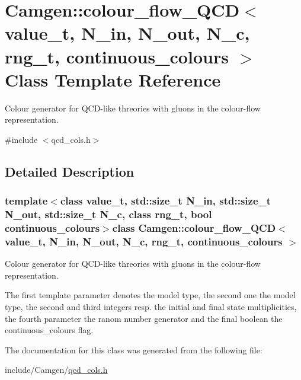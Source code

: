 \hypertarget{a00079}{\section{Camgen\-:\-:colour\-\_\-flow\-\_\-\-Q\-C\-D$<$ value\-\_\-t, N\-\_\-in, N\-\_\-out, N\-\_\-c, rng\-\_\-t, continuous\-\_\-colours $>$ Class Template Reference}
\label{a00079}
}


Colour generator for Q\-C\-D-\/like threories with gluons in the colour-\/flow representation.  




{\ttfamily \#include $<$qcd\-\_\-cols.\-h$>$}



\subsection{Detailed Description}
\subsubsection*{template$<$class value\-\_\-t, std\-::size\-\_\-t N\-\_\-in, std\-::size\-\_\-t N\-\_\-out, std\-::size\-\_\-t N\-\_\-c, class rng\-\_\-t, bool continuous\-\_\-colours$>$class Camgen\-::colour\-\_\-flow\-\_\-\-Q\-C\-D$<$ value\-\_\-t, N\-\_\-in, N\-\_\-out, N\-\_\-c, rng\-\_\-t, continuous\-\_\-colours $>$}

Colour generator for Q\-C\-D-\/like threories with gluons in the colour-\/flow representation. 

The first template parameter denotes the model type, the second one the model type, the second and third integers resp. the initial and final state multiplicities, the fourth parameter the ranom number generator and the final boolean the continuous\-\_\-colours flag. 

The documentation for this class was generated from the following file\-:\begin{DoxyCompactItemize}
\item 
include/\-Camgen/\hyperlink{a00724}{qcd\-\_\-cols.\-h}\end{DoxyCompactItemize}
